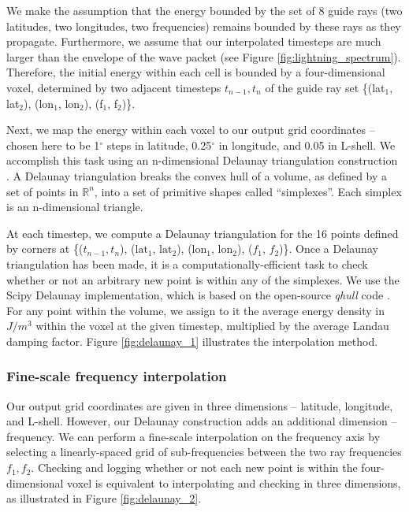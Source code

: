 We make the assumption that the energy bounded by the set of 8 guide rays (two latitudes, two longitudes, two frequencies) remains bounded by these rays as they propagate. Furthermore, we assume that our interpolated timesteps are much larger than the envelope of the wave packet (see Figure \ref{fig:lightning_spectrum}). Therefore, the initial energy within each cell is bounded by a four-dimensional voxel, determined by two adjacent timesteps $t_{n-1}, t_n$ of the guide ray set \{(lat$_1$, lat$_2$), (lon$_1$, lon$_2$), (f$_1$, f$_2$)\}.

Next, we map the energy within each voxel to our output grid coordinates -- chosen here to be 1$^\circ$ steps in latitude, 0.25$^\circ$ in longitude, and 0.05 in L-shell. We accomplish this task using an n-dimensional Delaunay triangulation construction \citep{Delaunay1934, Lee1980}. A Delaunay triangulation breaks the convex hull of a volume, as defined by a set of points in $\mathbb R^n$, into a set of primitive shapes called ``simplexes''. Each simplex is an n-dimensional triangle. 

At each timestep, we compute a Delaunay triangulation for the 16 points defined by corners at \{($t_{n-1}, t_n$), ($\mathrm{lat}_1$, $\mathrm{lat}_2$), ($\mathrm{lon}_1$, $\mathrm{lon}_2$), ($f_1$, $f_2$)\}. Once a Delaunay triangulation has been made, it is a computationally-efficient task to check whether or not an arbitrary new point is within any of the simplexes. We use the Scipy Delaunay implementation, which is based on the open-source \emph{qhull} code \citep{Barber1996}. For any point within the volume, we assign to it the average energy density in $J/m^3$ within the voxel at the given timestep, multiplied by the average Landau damping factor. Figure \ref{fig:delaunay_1} illustrates the interpolation method.

\subsubsection{Fine-scale frequency interpolation}
Our output grid coordinates are given in three dimensions -- latitude, longitude, and L-shell. However, our Delaunay construction adds an additional dimension -- frequency. We can perform a fine-scale interpolation on the frequency axis by selecting a linearly-spaced grid of sub-frequencies between the two ray frequencies $f_1, f_2$. Checking and logging whether or not each new point is within the four-dimensional voxel is equivalent to interpolating and checking in three dimensions, as illustrated in Figure \ref{fig:delaunay_2}.

